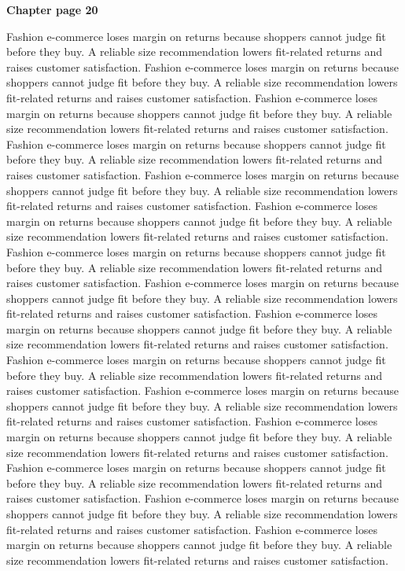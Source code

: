 \documentclass[a4paper,11pt]{article}
\begin{document}
{\headfont\bfseries\Large Chapter page 20}\par\medskip
Fashion e-commerce loses margin on returns because shoppers cannot judge fit before they buy. A reliable size recommendation lowers fit-related returns and raises customer satisfaction. Fashion e-commerce loses margin on returns because shoppers cannot judge fit before they buy. A reliable size recommendation lowers fit-related returns and raises customer satisfaction. Fashion e-commerce loses margin on returns because shoppers cannot judge fit before they buy. A reliable size recommendation lowers fit-related returns and raises customer satisfaction. Fashion e-commerce loses margin on returns because shoppers cannot judge fit before they buy. A reliable size recommendation lowers fit-related returns and raises customer satisfaction. Fashion e-commerce loses margin on returns because shoppers cannot judge fit before they buy. A reliable size recommendation lowers fit-related returns and raises customer satisfaction. 
Fashion e-commerce loses margin on returns because shoppers cannot judge fit before they buy. A reliable size recommendation lowers fit-related returns and raises customer satisfaction. Fashion e-commerce loses margin on returns because shoppers cannot judge fit before they buy. A reliable size recommendation lowers fit-related returns and raises customer satisfaction. Fashion e-commerce loses margin on returns because shoppers cannot judge fit before they buy. A reliable size recommendation lowers fit-related returns and raises customer satisfaction. Fashion e-commerce loses margin on returns because shoppers cannot judge fit before they buy. A reliable size recommendation lowers fit-related returns and raises customer satisfaction. Fashion e-commerce loses margin on returns because shoppers cannot judge fit before they buy. A reliable size recommendation lowers fit-related returns and raises customer satisfaction. 
Fashion e-commerce loses margin on returns because shoppers cannot judge fit before they buy. A reliable size recommendation lowers fit-related returns and raises customer satisfaction. Fashion e-commerce loses margin on returns because shoppers cannot judge fit before they buy. A reliable size recommendation lowers fit-related returns and raises customer satisfaction. Fashion e-commerce loses margin on returns because shoppers cannot judge fit before they buy. A reliable size recommendation lowers fit-related returns and raises customer satisfaction. Fashion e-commerce loses margin on returns because shoppers cannot judge fit before they buy. A reliable size recommendation lowers fit-related returns and raises customer satisfaction. Fashion e-commerce loses margin on returns because shoppers cannot judge fit before they buy. A reliable size recommendation lowers fit-related returns and raises customer satisfaction. \newpage
\end{document}
